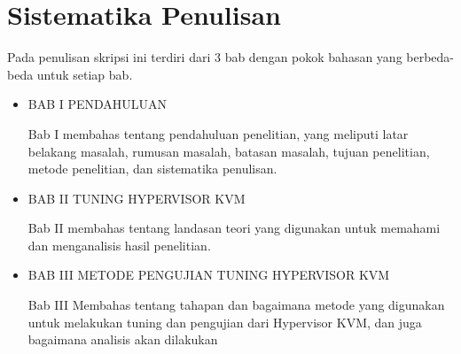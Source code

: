 \section{Sistematika Penulisan}
Pada penulisan skripsi ini terdiri dari 3 bab dengan pokok bahasan yang berbeda-beda untuk setiap bab.
\begin{itemize}
    \item BAB I PENDAHULUAN

    Bab I membahas tentang pendahuluan penelitian, yang meliputi latar belakang masalah, rumusan masalah, batasan masalah, tujuan penelitian, metode penelitian, dan sistematika penulisan.
    
    \item BAB II TUNING HYPERVISOR KVM

    Bab II membahas tentang landasan teori yang digunakan untuk memahami dan menganalisis hasil penelitian.
    
    \item BAB III METODE PENGUJIAN TUNING HYPERVISOR KVM
    
    Bab III Membahas tentang tahapan dan bagaimana metode yang digunakan untuk melakukan tuning dan pengujian dari Hypervisor KVM, dan juga bagaimana analisis akan dilakukan
\end{itemize}